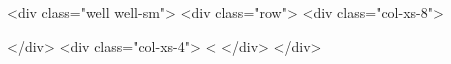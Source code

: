 <div class="well well-sm">
  <div class="row">
    <div class="col-xs-8">

    </div>
    <div class="col-xs-4">
         <%
    </div>
  </div>
